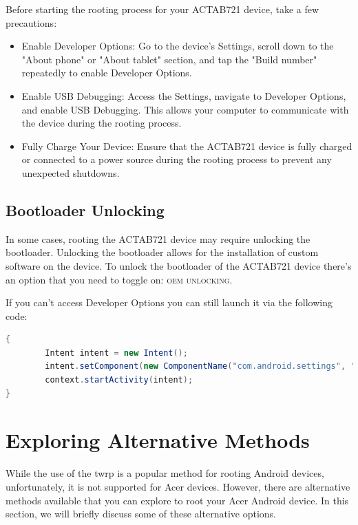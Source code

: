 Before starting the rooting process for your ACTAB721 device, take a few precautions:

\begin{itemize}
  \item Enable Developer Options: Go to the device's Settings, scroll down to the "About phone" or "About tablet" section, and tap the "Build number" repeatedly to enable Developer Options.
  \item Enable USB Debugging: Access the Settings, navigate to Developer Options, and enable USB Debugging. This allows your computer to communicate with the device during the rooting process.
  \item Fully Charge Your Device: Ensure that the ACTAB721 device is fully charged or connected to a power source during the rooting process to prevent any unexpected shutdowns.
\end{itemize}

\subsection{Bootloader Unlocking}

In some cases, rooting the ACTAB721 device may require unlocking the bootloader. Unlocking the bootloader allows for the installation of custom software on the device. To unlock the bootloader of the ACTAB721 device there's an option that you need to toggle on: \faToggleOn \textsc{oem unlocking}.

If you can't access Developer Options you can still launch it via the following code:

\begin{lstlisting}[language=Java,linewidth=0.95\linewidth,caption={Launching Developer Options Activity}, label=lst:dev-activity, escapechar=\%]
{
        Intent intent = new Intent();
        intent.setComponent(new ComponentName("com.android.settings", "com.android.settings.DevelopmentSettings"));
        context.startActivity(intent);
}
\end{lstlisting}

\section{Exploring Alternative Methods}{\faCaretRight}
While the use of the \gls{twrp} is a popular method for rooting Android devices, unfortunately, it is not supported for Acer devices. However, there are alternative methods available that you can explore to root your Acer Android device. In this section, we will briefly discuss some of these alternative options.

